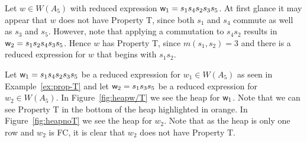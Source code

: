 \begin{example}\label{ex:prop-T}
Let $w \in W(A_5)$ with reduced expression $\mathsf{w}_1=s_1s_4s_2s_3s_5$. At first glance it may appear that $w$ does not have Property T, since both $s_1$ and $s_4$ commute as well as $s_3$ and $s_5$. However, note that applying a commutation to $s_4s_2$ results in $\mathsf{w}_2=s_1s_2s_4s_3s_5$. Hence $w$ has Property T, since $m(s_1,s_2)=3$ and there is a reduced expression for $w$ that begins with $s_1s_2$.	
\end{example}




\begin{example}
Let $\mathsf{w}_1=s_1s_4s_2s_3s_5$ be a reduced expression for $w_1 \in W(A_5)$ as seen in Example~\ref{ex:prop-T}	and let $\mathsf{w}_2=s_1s_3s_5$ be a reduced expression for $w_2 \in W(A_5)$. In Figure~\ref{fig:heapw/T} we see the heap for $\mathsf{w}_1$. Note that we can see Property T in the bottom of the heap highlighted in orange. In Figure~\ref{fig:heapnoT} we see the heap for $w_2$. Note that as the heap is only one row and $w_2$ is FC, it is clear that $w_2$ does not have Property T.
\end{example}


